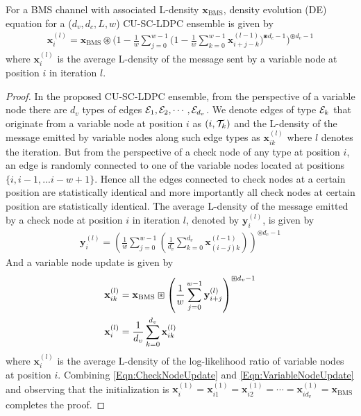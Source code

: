 \begin{lemma}\label{Lemma:DE_SCLDPC}
For a BMS channel with associated L-density $\mathbf{x}_{\text{BMS}}$\cite{richardson2008modern}, density evolution (DE) equation for a ($d_{v},d_{c},L,w$) CU-SC-LDPC ensemble is given by
\begin{align}
\mathbf{x}_{i}^{(l)}\!=\!\mathbf{x}_{\text{BMS}}\!\circledast\!\bigg( 1-\frac{1}{w}\sum_{j=0}^{w-1}\!\Big(1-\frac{1}{w}\sum_{k=0}^{w-1}\mathbf{x}_{i+j-k}^{(l-1)}\Big)^{\boxast d_{c}-1} \bigg)^{\circledast d_{v}-1}
\label{Eqn:DE_SCLDPC}
\end{align}
where $\mathbf{x}_{i}^{(l)}$ is the average L-density of the message sent by a variable node at position $i$ in iteration $l$.
\end{lemma}
\begin{proof}
In the proposed CU-SC-LDPC ensemble, from the perspective of a variable node there are $d_{v}$ types of edges $\mathcal{E}_{1},\mathcal{E}_{2},\cdots,\mathcal{E}_{d_{v}}$. We denote edges of type $\mathcal{E}_{k}$ that originate from a variable node at position $i$ as $(i,\mathcal{T}_{k})$ and the L-density of the message emitted by variable nodes along such edge types as $\mathbf{x}_{ik}^{(l)}$ where $l$  denotes the iteration. But from the perspective of a check node of any type at position $i$, an edge is randomly connected to one of the variable nodes located at positions $\{i, i-1,... i-w+1\}$.	Hence all the edges connected to check nodes at a certain position are statistically identical and more importantly all check nodes at certain position are statistically identical. The average L-density of the message emitted by a check node at position $i$ in iteration $l$, denoted by $\mathbf{y}_{i}^{(l)}$, is given by
\begin{align}
\mathbf{y}_{i}^{(l)}=\left(\frac{1}{w}\sum_{j=0}^{w-1}\left(\frac{1}{d_{v}}\sum_{k=0}^{d_{v}}\mathbf{x}_{(i-j)k}^{(l-1)}\right)\right)^{\circledast d_{c}-1}
\label{Eqn:CheckNodeUpdate}
\end{align}
And a variable node update is given by
\begin{align}
\mathbf{x}_{ik}^{(l)}&=\mathbf{x}_{\text{BMS}}\boxast \left(\frac{1}{w}\sum_{j=0}^{w-1}\mathbf{y}_{i+j}^{(l)}\right)^{\boxast d_{v}-1}\label{Eqn:VariableNodeUpdate}\\
\mathbf{x}_{i}^{(l)}&=\frac{1}{d_{v}}\sum_{k=0}^{d_{v}}\mathbf{x}_{ik}^{(l)}\notag
\end{align}
where $\mathbf{x}_{i}^{(l)}$ is the average L-density of the log-likelihood ratio of variable nodes at position $i$.
Combining \eqref{Eqn:CheckNodeUpdate} and \eqref{Eqn:VariableNodeUpdate} and observing that the initialization
is $\mathbf{x}_{i}^{(1)}=\mathbf{x}_{i1}^{(1)}=\mathbf{x}_{i2}^{(1)}=\cdots=\mathbf{x}_{id_{v}}^{(1)}=\mathbf{x}_{\text{BMS}}$ completes the proof.
\end{proof}

